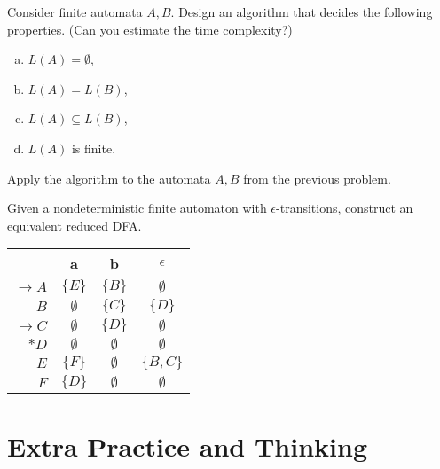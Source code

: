 \documentclass[a4paper,12pt]{amsart}
\begin{document}
\begin{problem}

    Consider finite automata $A,B$. Design an algorithm that decides the following properties. (Can you estimate the time complexity?)
    
    \begin{multicols}{4}
    
        \begin{enumerate}[(a)]\setlength\itemsep{6pt}
            \item $L(A)=\emptyset$,
            \item $L(A)=L(B)$,
            \item $L(A)\subseteq L(B)$,
            \item $L(A)$ is finite.
        \end{enumerate}

    \end{multicols}

    Apply the algorithm to the automata $A,B$ from the previous problem.

\end{problem}


\begin{problem}

    Given a nondeterministic finite automaton with  $\epsilon$-transitions, construct an equivalent reduced DFA.
    
    \begin{center}
        \begin{tabular}{ r | c c c }
            & a & b & $\epsilon$ \\ \hline
            $\to A$ & $\{E\}$ & $\{B\}$ & $\emptyset$ \\
            $B$ & $\emptyset$ & $\{C\}$ & $\{D\}$ \\
            $\to C$ & $\emptyset$ & $\{D\}$ & $\emptyset$ \\
            $\ast D$ & $\emptyset$ & $\emptyset$ & $\emptyset$ \\
            $E$ & $\{F\}$ & $\emptyset$ & $\{B,C\}$\\
            $F$ & $\{D\}$ & $\emptyset$ & $\emptyset$
        \end{tabular}
    \end{center}

\end{problem}



\section*{Extra Practice and Thinking}
\end{document}
